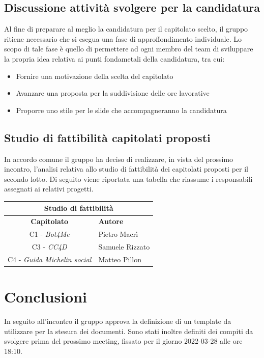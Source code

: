 \documentclass[12pt, a4paper,table]{article}
\begin{document}
		 \subsection {Discussione attività svolgere per la candidatura}
		Al fine di preparare al meglio la candidatura per il capitolato scelto, il gruppo ritiene necessario che si esegua una fase di approffondimento individuale. Lo scopo di tale fase è quello di permettere ad ogni membro del team di sviluppare la propria idea relativa ai punti fondametali della candidatura, tra cui:
		\begin{itemize}
			\item Fornire una motivazione della scelta del capitolato
			\item Avanzare una proposta per la suddivisione delle ore lavorative
			\item Proporre uno stile per le slide che accompagneranno la candidatura
		\end{itemize}

		\newpage
		 \subsection {Studio di fattibilità capitolati proposti}
		In accordo comune il gruppo ha deciso di realizzare, in vista del prossimo incontro, l'analisi relativa allo studio di fattibilità dei capitolati proposti per il secondo lotto. Di seguito viene riportata una tabella che riassume i responsabili assegnati ai relativi progetti.  
		\vspace{1em} 
		
		 \renewcommand{\arraystretch}{1.8} %
		 \begin{center}
		 \begin{tabular}{ |c|l| }
			\hline \multicolumn{2}{|c|}{\textbf{Studio di fattibilità }} \\
			\hline
			\textbf{Capitolato} & \textbf{Autore} \\
			\hline
			C1 - \textit{Bot4Me} & Pietro Macrì\\
			\hline
			C3 - \textit{CC4D} & Samuele Rizzato\\
			\hline
			C4 - \textit{Guida Michelin social }& Matteo Pillon\\
			\hline
		 \end{tabular}
		\end{center}
	
		 \section{Conclusioni}
	     In seguito all'incontro il gruppo approva la definizione di un template da utilizzare per la stesura dei documenti. Sono stati inoltre definiti dei compiti da svolgere prima del prossimo meeting, fissato per il giorno 2022-03-28 alle ore 18:10. 
	\newpage
	
\end{document}
